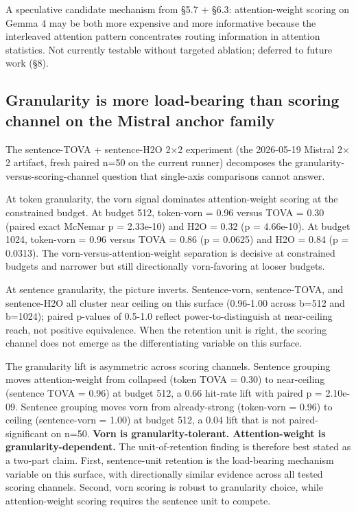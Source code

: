 \documentclass[10pt]{article}
\begin{document}
A speculative candidate mechanism from \S{}5.7 + \S{}6.3: attention-weight
scoring on Gemma 4 may be both more expensive and more informative
because the interleaved attention pattern concentrates routing
information in attention statistics. Not currently testable without
targeted ablation; deferred to future work (\S{}8).

\subsection{Granularity is more load-bearing than scoring channel on the Mistral anchor family}\label{62-granularity-is-more-load-bearing-than-scoring-channel-on-the-mistral-anchor-family}

The sentence-TOVA + sentence-H2O 2$\times$2 experiment (the
2026-05-19 Mistral 2$\times$2 artifact, fresh paired n=50 on the current
runner) decomposes the granularity-versus-scoring-channel question that
single-axis comparisons cannot answer.

At token granularity, the vorn signal dominates
attention-weight scoring at the constrained budget. At budget 512,
token-vorn = 0.96 versus TOVA = 0.30 (paired exact McNemar p =
2.33e-10) and H2O = 0.32 (p = 4.66e-10). At budget 1024,
token-vorn = 0.96 versus TOVA = 0.86 (p = 0.0625) and H2O =
0.84 (p = 0.0313). The vorn-versus-attention-weight separation is
decisive at constrained budgets and narrower but still directionally
vorn-favoring at looser budgets.

At sentence granularity, the picture inverts. Sentence-vorn,
sentence-TOVA, and sentence-H2O all cluster near ceiling on this surface
(0.96-1.00 across b=512 and b=1024); paired p-values of 0.5-1.0 reflect
power-to-distinguish at near-ceiling reach, not positive equivalence.
When the retention unit is right, the scoring channel does not emerge as
the differentiating variable on this surface.

The granularity lift is asymmetric across scoring channels. Sentence
grouping moves attention-weight from collapsed (token TOVA = 0.30)
to near-ceiling (sentence TOVA = 0.96) at budget 512, a 0.66
hit-rate lift with paired p = 2.10e-09. Sentence grouping moves vorn
from already-strong (token-vorn = 0.96) to ceiling (sentence-vorn =
1.00) at budget 512, a 0.04 lift that is not paired-significant on n=50.
\textbf{Vorn is granularity-tolerant. Attention-weight is
granularity-dependent.} The unit-of-retention finding is therefore best
stated as a two-part claim. First, sentence-unit retention is the
load-bearing mechanism variable on this surface, with directionally
similar evidence across all tested scoring channels. Second,
vorn scoring is robust to granularity choice, while
attention-weight scoring requires the sentence unit to compete.
\end{document}
